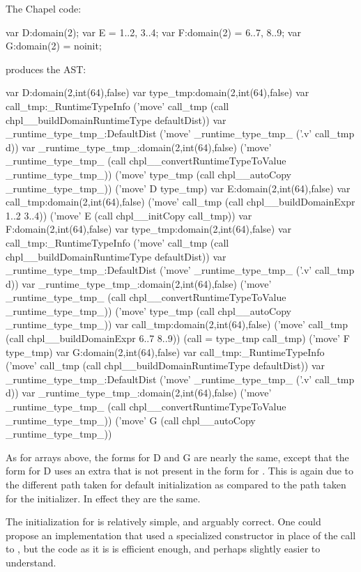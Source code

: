 The Chapel code:
\begin{chapel}
  var D:domain(2);
  var E = {1..2, 3..4};
  var F:domain(2) = {6..7, 8..9};
  var G:domain(2) = noinit;
\end{chapel}
\noindent
produces the AST:
\begin{numberedchapel}
    var D:domain(2,int(64),false)
    {
      var type_tmp:domain(2,int(64),false)
      var call_tmp:_RuntimeTypeInfo
      ('move' call_tmp (call chpl__buildDomainRuntimeType defaultDist))
      var _runtime_type_tmp_:DefaultDist
      ('move' _runtime_type_tmp_ ('.v' call_tmp d))
      var _runtime_type_tmp_:domain(2,int(64),false)
      ('move' _runtime_type_tmp_ (call chpl__convertRuntimeTypeToValue _runtime_type_tmp_))
      ('move' type_tmp (call chpl__autoCopy _runtime_type_tmp_))
      ('move' D type_tmp)
    }
    var E:domain(2,int(64),false)
    var call_tmp:domain(2,int(64),false)
    ('move' call_tmp (call chpl__buildDomainExpr 1..2 3..4))
    ('move' E (call chpl__initCopy call_tmp))
    var F:domain(2,int(64),false)
    {
      var type_tmp:domain(2,int(64),false)
      var call_tmp:_RuntimeTypeInfo
      ('move' call_tmp (call chpl__buildDomainRuntimeType defaultDist))
      var _runtime_type_tmp_:DefaultDist
      ('move' _runtime_type_tmp_ ('.v' call_tmp d))
      var _runtime_type_tmp_:domain(2,int(64),false)
      ('move' _runtime_type_tmp_ (call chpl__convertRuntimeTypeToValue _runtime_type_tmp_))
      ('move' type_tmp (call chpl__autoCopy _runtime_type_tmp_))
      var call_tmp:domain(2,int(64),false)
      ('move' call_tmp (call chpl__buildDomainExpr 6..7 8..9))
      (call = type_tmp call_tmp)
      ('move' F type_tmp)
    }
    var G:domain(2,int(64),false)
    var call_tmp:_RuntimeTypeInfo
    ('move' call_tmp (call chpl__buildDomainRuntimeType defaultDist))
    var _runtime_type_tmp_:DefaultDist
    ('move' _runtime_type_tmp_ ('.v' call_tmp d))
    var _runtime_type_tmp_:domain(2,int(64),false)
    ('move' _runtime_type_tmp_ (call chpl__convertRuntimeTypeToValue _runtime_type_tmp_))
    ('move' G (call chpl__autoCopy _runtime_type_tmp_))
\end{numberedchapel}

As for arrays above, the forms for D and G are nearly the same, except that the form for D
uses an extra  that is not present in the form for .  This is again
due to the different path taken for default initialization as compared to the path taken
for the  initializer.  In effect they are the same.

The initialization for  is relatively simple, and arguably correct.  One could
propose an implementation that used a specialized constructor in place of the call to
, but the code as it is is efficient enough, and perhaps
slightly easier to understand.

